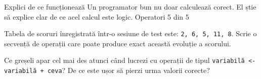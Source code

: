 \clearpage

\PageHeader
  {Explici de ce funcționează}
  {Un programator bun nu doar calculează corect. El știe să explice clar de ce acel calcul este logic.}
  {Operatori 5 din 5}

\begin{solobox}
Tabela de scoruri înregistrată într-o sesiune de test este: \texttt{2, 6, 5, 11, 8}. Scrie o secvență de operații care poate produce exact această evoluție a scorului.
\end{solobox}

\begin{solobox}[Reflecție]
Ce greșeli apar cel mai des atunci când lucrezi cu operații de tipul \texttt{variabilă <- variabilă + ceva}? De ce este ușor să pierzi urma valorii corecte?
\end{solobox}

\clearpage
